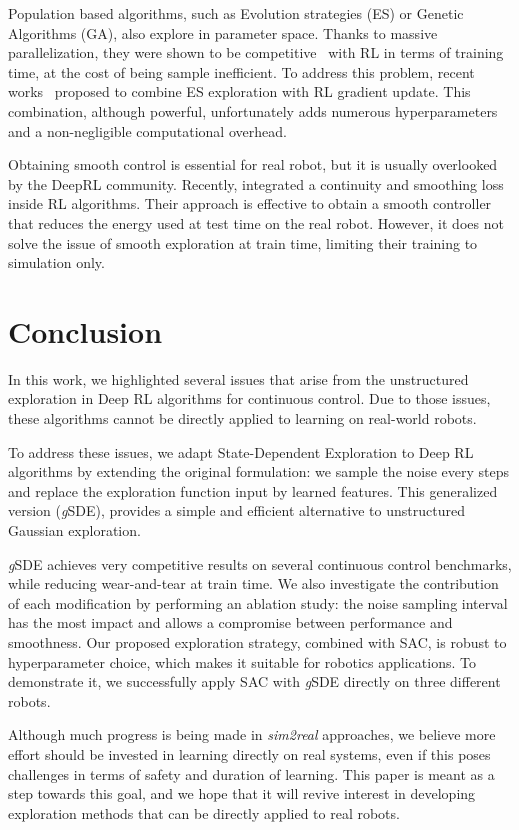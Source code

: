 \documentclass{article}
\newcommand{\sde}{State-Dependent Exploration\xspace}
\newcommand{\ourSDE}{\textit{g}\textsc{SDE}\xspace}
\newcommand{\sac}{\textsc{SAC}\xspace}
\begin{document}
Population based algorithms, such as Evolution strategies (ES) or Genetic Algorithms (GA), also explore in parameter space. Thanks to massive parallelization, they were shown to be competitive~\citep{such2017deep} with RL in terms of training time, at the cost of being sample inefficient. To address this problem,
recent works~\citep{pourchot2018cem} proposed to combine ES exploration with RL gradient update. This combination, although powerful, unfortunately adds numerous hyperparameters and a non-negligible computational overhead.

Obtaining smooth control is essential for real robot, but it is usually overlooked by the DeepRL community.
Recently, \citet{mysore2021caps} integrated a continuity and smoothing loss inside RL algorithms.
Their approach is effective to obtain a smooth controller that reduces the energy used at test time on the real robot.
However, it does not solve the issue of smooth exploration at train time, limiting their training to simulation only.

\section{Conclusion}

In this work, we highlighted several issues that arise from the unstructured exploration in Deep RL algorithms for continuous control. Due to those issues, these algorithms cannot be directly applied to learning on real-world robots.

To address these issues, we adapt \sde to Deep RL algorithms by extending the original formulation: we sample the noise every  steps and replace the exploration function input by learned features.
This generalized version (\ourSDE), provides a simple and efficient alternative to unstructured Gaussian exploration.

\ourSDE achieves very competitive results on several continuous control benchmarks, while reducing wear-and-tear at train time.
We also investigate the contribution of each modification by performing an ablation study: the noise sampling interval has the most impact and allows a compromise between performance and smoothness.
Our proposed exploration strategy, combined with \sac, is robust to hyperparameter choice, which makes it suitable for robotics applications.
To demonstrate it, we successfully apply \sac with \ourSDE directly on three different robots.

Although much progress is being made in \textit{sim2real} approaches, we believe
more effort should be invested in learning directly on real systems, even if this poses challenges in terms of safety and duration of learning.
This paper is meant as a step towards this goal, and we hope that it will revive interest in developing exploration methods that can be directly applied to real robots.
\end{document}
